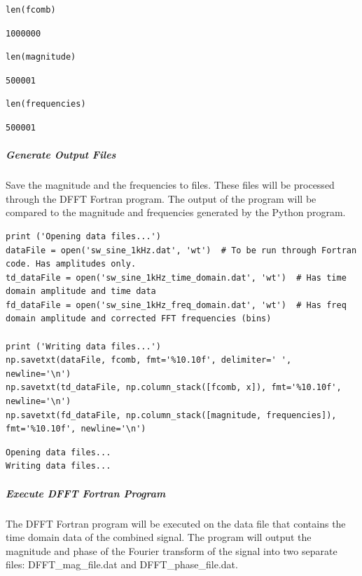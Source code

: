 \begin{verbatim}
len(fcomb)
\end{verbatim}

\begin{verbatim}
1000000
\end{verbatim}

\begin{verbatim}
len(magnitude)
\end{verbatim}

\begin{verbatim}
500001
\end{verbatim}

\begin{verbatim}
len(frequencies)
\end{verbatim}

\begin{verbatim}
500001
\end{verbatim}

\subparagraph{Generate Output Files}

Save the magnitude and the frequencies to files.  These files will be processed through the DFFT Fortran program.  The output of the program will be compared to the magnitude and frequencies generated by the Python program.

\begin{verbatim}
print ('Opening data files...')
dataFile = open('sw_sine_1kHz.dat', 'wt')  # To be run through Fortran code. Has amplitudes only.
td_dataFile = open('sw_sine_1kHz_time_domain.dat', 'wt')  # Has time domain amplitude and time data
fd_dataFile = open('sw_sine_1kHz_freq_domain.dat', 'wt')  # Has freq domain amplitude and corrected FFT frequencies (bins)

print ('Writing data files...')
np.savetxt(dataFile, fcomb, fmt='%10.10f', delimiter=' ', newline='\n')
np.savetxt(td_dataFile, np.column_stack([fcomb, x]), fmt='%10.10f', newline='\n')
np.savetxt(fd_dataFile, np.column_stack([magnitude, frequencies]), fmt='%10.10f', newline='\n')
\end{verbatim}

\begin{verbatim}
Opening data files...
Writing data files...
\end{verbatim}

\subparagraph{Execute DFFT Fortran Program}

The DFFT Fortran program will be executed on the data file that contains the time domain data of the combined signal.  The program will output the magnitude and phase of the Fourier transform of the signal into two separate files: DFFT\_mag\_file.dat and DFFT\_phase\_file.dat.

